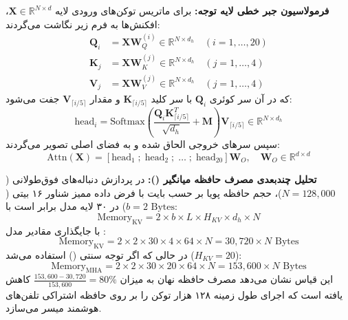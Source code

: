 \textbf{فرمولاسیون جبر خطی لایه توجه:}
برای ماتریس توکن‌های ورودی لایه $\mathbf{X} \in \mathbb{R}^{N \times d}$، افکنش‌ها به فرم زیر نگاشت می‌گردند:
\begin{align}
    \mathbf{Q}_i &= \mathbf{X} \mathbf{W}_Q^{(i)} \in \mathbb{R}^{N \times d_h} \quad (i = 1, \dots, 20) \\
    \mathbf{K}_j &= \mathbf{X} \mathbf{W}_K^{(j)} \in \mathbb{R}^{N \times d_h} \quad (j = 1, \dots, 4) \\
    \mathbf{V}_j &= \mathbf{X} \mathbf{W}_V^{(j)} \in \mathbb{R}^{N \times d_h} \quad (j = 1, \dots, 4)
\end{align}
که در آن سر کوئری $\mathbf{Q}_i$ با سر کلید $\mathbf{K}_{\lceil i/5 \rceil}$ و مقدار $\mathbf{V}_{\lceil i/5 \rceil}$ جفت می‌شود:
\begin{equation}
    \text{head}_i = \text{Softmax}\left(\frac{\mathbf{Q}_i \mathbf{K}_{\lceil i/5 \rceil}^T}{\sqrt{d_h}} + \mathbf{M}\right) \mathbf{V}_{\lceil i/5 \rceil} \in \mathbb{R}^{N \times d_h}
\end{equation}
سپس سرهای خروجی الحاق شده و به فضای اصلی تصویر می‌گردند:
\begin{equation}
    \text{Attn}(\mathbf{X}) = \left[ \text{head}_1 \;;\; \text{head}_2 \;;\; \dots \;;\; \text{head}_{20} \right] \mathbf{W}_O, \quad \mathbf{W}_O \in \mathbb{R}^{d \times d}
\end{equation}

\textbf{تحلیل چندبعدی مصرف حافظه میانگیر ():}
در پردازش دنباله‌های فوق‌طولانی ($N = 128{,}000$)، حجم حافظه پویا بر حسب بایت با فرض داده ممیز شناور ۱۶ بیتی ($b = 2 \text{ Bytes}$) در ۳۰ لایه مدل برابر است با:
\begin{equation}
    \text{Memory}_{\text{KV}} = 2 \times b \times L \times H_{KV} \times d_h \times N
\end{equation}
با جایگذاری مقادیر مدل :
\begin{equation}
    \text{Memory}_{\text{KV}} = 2 \times 2 \times 30 \times 4 \times 64 \times N = 30{,}720 \times N \text{ Bytes}
\end{equation}
در حالی که اگر توجه سنتی () استفاده می‌شد ($H_{KV} = 20$):
\begin{equation}
    \text{Memory}_{\text{MHA}} = 2 \times 2 \times 30 \times 20 \times 64 \times N = 153{,}600 \times N \text{ Bytes}
\end{equation}
این قیاس نشان می‌دهد مصرف حافظه نهان به میزان $\frac{153{,}600 - 30{,}720}{153{,}600} = 80\%$ کاهش یافته است که اجرای طول زمینه ۱۲۸ هزار توکن را بر روی حافظه اشتراکی تلفن‌های هوشمند میسر می‌سازد.

